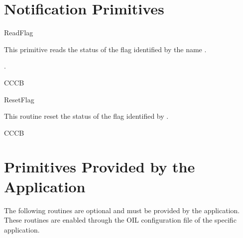 \pagebreak


\section{Notification Primitives}

\begin{function}{ReadFlag}
 \begin{fundescription}
   This primitive reads the status of the flag identified by the name .
 \end{fundescription}
 \begin{funreturn}
   .
 \end{funreturn}
 \begin{funconformance}
  CCCB
  \end{funconformance}
\end{function}

\begin{function}{ResetFlag}
  \begin{fundescription}
    This routine reset the status of the flag identified by .
   \end{fundescription}
   \begin{funconformance}
    CCCB
   \end{funconformance}
\end{function}



\pagebreak






\section{Primitives Provided by the Application}

The following routines are optional and must be provided by the application. 
These routines are enabled through the OIL configuration file 
of the specific application.


